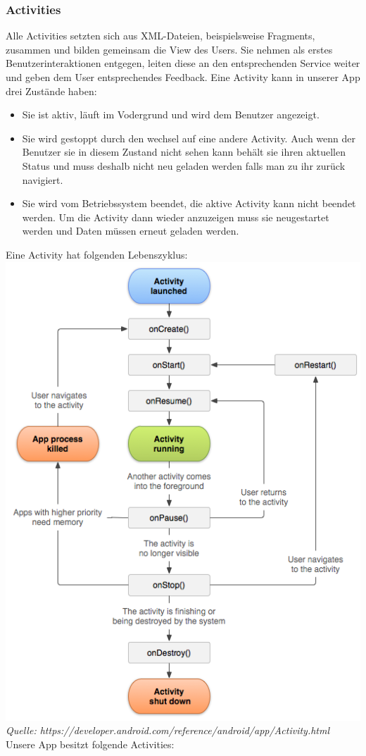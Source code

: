 	\subsubsection{Activities}
Alle Activities setzten sich aus XML-Dateien, beispielsweise Fragments, zusammen und bilden gemeinsam die View des Users.
Sie nehmen als erstes Benutzerinteraktionen entgegen, leiten diese an den entsprechenden Service weiter und geben dem User entsprechendes Feedback.
\newline Eine Activity kann in unserer App drei Zustände haben:
\begin{itemize}
\item Sie ist aktiv, läuft im Vodergrund und wird dem Benutzer angezeigt.
\item Sie wird gestoppt durch den wechsel auf eine andere Activity. Auch wenn der Benutzer sie in diesem Zustand nicht sehen kann behält sie ihren aktuellen Status und muss deshalb nicht neu geladen werden falls man zu ihr zurück navigiert.
\item Sie wird vom Betriebssystem beendet, die aktive Activity kann nicht beendet werden.  Um die Activity dann wieder anzuzeigen muss sie neugestartet werden und Daten müssen erneut geladen werden.
\end{itemize}
Eine Activity hat folgenden Lebenszyklus:\newline
\includegraphics[width=.8\textwidth]{activity_lifecycle.png}
\textit{Quelle: https://developer.android.com/reference/android/app/Activity.html}
Unsere App besitzt folgende Activities:
\newline

